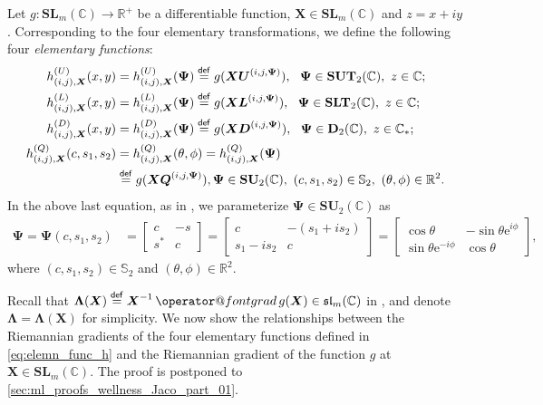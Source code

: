 \documentclass[final,onefignum,onetabnum]{siamart190516}
\makeatletter
\newcommand{\matr}[1]{\boldsymbol{#1}}
\newcommand{\ProjGrad}[2]{\mathop{{\operator@font grad} }#1(#2)}
\newcommand{\eqdef}{\stackrel{\sf def}{=}}
\newcommand{\RR}{\mathbb{R}}
\newcommand{\CC}{\mathbb{C}}
\newcommand{\Gmat}[3]{\matr{Q}^{(#1,#2,#3)}}
\newcommand{\Utwo}{\Psi}
\newcommand{\SUNN}[1]{\mathbf{SU}_{#1}}
\newcommand{\SL}{\mathbf{SL}}
\newcommand{\SUT}{\mathbf{SUT}}
\newcommand{\SLT}{\mathbf{SLT}}
\newcommand{\DT}{\mathbf{D}}
\newcommand{\sll}{\mathfrak{sl}}
\newcommand{\Lmat}[3]{\matr{L}^{(#1,#2,#3)}}
\newcommand{\Umat}[3]{\matr{U}^{(#1,#2,#3)}}
\newcommand{\Dmat}[3]{\matr{D}^{(#1,#2,#3)}}
\newcommand{\ue}{\mathrm{e}}
\newcommand{\ui}{i}
\makeatother
\begin{document}
Let $g: \SL_{m}(\CC)\rightarrow\RR^+$ be a differentiable function,
 $\matr{X}\in\SL_{m}(\CC)$ and $z=x+\ui y$. 
Corresponding to the  four elementary transformations, 
we  define the following four  \emph{elementary functions}:
\begin{equation}\label{eq:elemn_func_h}
\begin{aligned}
h^{(U)}_{(i,j),\matr{X}}(x,y)&=h^{(U)}_{(i,j),\matr{X}}(\matr{\Utwo}) \eqdef g(\matr{X}\Umat{i}{j}{\matr{\Utwo}}),\ \  \matr{\Utwo} \in \SUT_{2}(\CC),\ z\in\CC;\\
h^{(L)}_{(i,j),\matr{X}}(x,y)&=h^{(L)}_{(i,j),\matr{X}}(\matr{\Utwo})  \eqdef g(\matr{X}\Lmat{i}{j}{\matr{\Utwo}}),\ \ \matr{\Utwo} \in \SLT_{2}(\CC), \ z\in\CC;\\
h^{(D)}_{(i,j),\matr{X}}(x,y)&=h^{(D)}_{(i,j),\matr{X}}(\matr{\Utwo}) \eqdef g(\matr{X}\Dmat{i}{j}{\matr{\Utwo}}),\ \ \matr{\Utwo} \in \DT_{2}(\CC), \ z\in\CC_{*};\\
h^{(Q)}_{(i,j),\matr{X}}(c,s_1,s_2)&=h^{(Q)}_{(i,j),\matr{X}}(\theta,\phi)=h^{(Q)}_{(i,j),\matr{X}}(\matr{\Utwo}) \\
&\eqdef g(\matr{X}\Gmat{i}{j}{\matr{\Utwo}}), \matr{\Utwo} \in \SUNN{2}(\CC),\  (c,s_1,s_2)\in\mathbb{S}_2,\ (\theta,\phi)\in\RR^2.
\end{aligned}
\end{equation}
In the above last equation, as in \cite{Como10:book,ULC2019}, we parameterize $\matr{\Utwo} \in \SUNN{2}(\CC)$ as  
\begin{align*}
\matr{\Psi}=\matr{\Utwo}(c,s_1,s_2)
&= \begin{bmatrix}
c & -s \\
s^{\ast} & c
\end{bmatrix}
= \begin{bmatrix}
c & -(s_1+\ui s_2) \\
s_1-\ui s_2 & c
\end{bmatrix}= \begin{bmatrix}
\cos\theta & -\sin\theta \ue^{\ui\phi} \\
\sin\theta \ue^{-\ui\phi} & \cos\theta
\end{bmatrix},
\end{align*}
where $(c,s_1,s_2)\in\mathbb{S}_{2}$ and $(\theta,\phi)\in\RR^2$.

Recall that $\matr{\Lambda}(\matr{X})\eqdef\matr{X}^{-1}\ProjGrad{g}{\matr{X}}\in\sll_{m}(\CC)$ in , and
denote $\matr{\Lambda}=\matr{\Lambda}(\matr{X})$ for simplicity. 
We now show the relationships between the Riemannian gradients of the four elementary functions defined in \cref{eq:elemn_func_h} and the Riemannian gradient of the function $g$ at $\matr{X}\in\SL_{m}(\CC)$.
The proof is postponed to \cref{sec:ml_proofs_wellness_Jaco_part_01}. 
\end{document}
